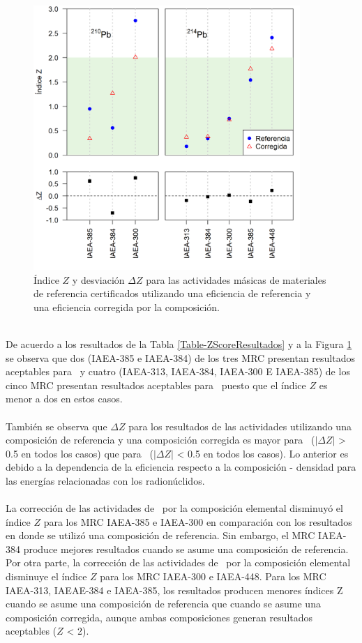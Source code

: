 \begin{figure}
\centering
\includegraphics[width=0.9\textwidth]{Imagenes/Z-score-results.png}
\caption{Índice $Z$ y desviación $\Delta Z$ para las actividades másicas de materiales de referencia certificados utilizando una eficiencia de referencia y una eficiencia corregida por la composición.}\label{Fig-ZScore}
\end{figure}
\\De acuerdo a los resultados de la Tabla \ref{Table-ZScoreResultados} y a la Figura \ref{Fig-ZScore} se observa que dos (IAEA-385 e IAEA-384) de los tres MRC presentan resultados aceptables para \PbCero\, y cuatro (IAEA-313, IAEA-384, IAEA-300 E IAEA-385) de los cinco MRC presentan resultados aceptables para \PbCuatro\, puesto que el índice $Z$ es menor a dos en estos casos. 
\\ \\ 
También se observa que $\Delta Z$ para los resultados de las actividades utilizando una composición de referencia y una composición corregida es mayor para \PbCero\, ($|\Delta Z|$ > 0.5 en todos los casos) que para \PbCuatro\, ($|\Delta Z|$ < 0.5 en todos los casos). Lo anterior es debido a la dependencia de la eficiencia respecto a la composición - densidad para las energías relacionadas con los radionúclidos. 
\\ \\ 
La corrección de las actividades de \PbCero\, por la composición elemental disminuyó el índice $Z$ para los MRC IAEA-385 e IAEA-300 en comparación con los resultados en donde se utilizó una composición de referencia. Sin embargo, el MRC IAEA-384 produce mejores resultados cuando se asume una composición de referencia. Por otra parte, la corrección de las actividades de \PbCuatro\, por la composición elemental disminuye el índice $Z$ para los MRC IAEA-300 e IAEA-448. Para los MRC IAEA-313, IAEAE-384 e IAEA-385, los resultados producen menores índices Z cuando se asume una composición de referencia que cuando se asume una composición corregida, aunque ambas composiciones generan resultados aceptables ($Z$ < 2). 
